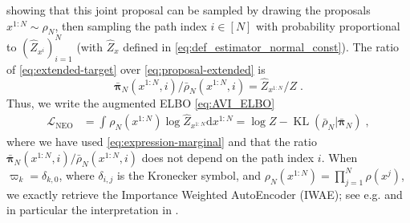 \documentclass{article}
\def\elboneq{\mathcal{L}_{\IFIS}}
\def\IFIS{\ensuremath{\operatorname{NEO}}}
\def\rmd{\operatorname{d}\hspace{-2pt}}
\def\rmd{\mathrm{d}}
\def\eqsp{\,}
\def\eqsp{\;}
\newcommand{\1}{\mathds{1}}
\def\proposal{\rho}
\newcommand{\chunku}[3]{#1^{#2:#3}}
\def\const{Z}
\newcommand{\estConstC}[1]{\widehat{Z}_{#1}}
\def\measpi{\boldsymbol{\pi}}
\def\rmd{\mathrm{d}}
\begin{document}
showing that this joint proposal can be sampled by drawing the proposals $\chunku{x}{1}{N} \sim \rho_N$, then sampling the path index $i \in [N]$ with probability proportional to $(\estConstC{x^i})_{i=1}^N$ (with $\estConstC{x}$ defined in \eqref{eq:def_estimator_normal_const}).
The ratio of \eqref{eq:extended-target} over \eqref{eq:proposal-extended} is
\begin{equation}
\label{eq:ratio-extended}
{\bar{\measpi}_N(\chunku{x}{1}{N},i)}\big/{\bar{\proposal}_N(\chunku{x}{1}{N},i)}= {\estConstC{\chunku{x}{1}{N}}}\big/{\const} \eqsp.
\end{equation}
Thus, we write the augmented ELBO   \eqref{eq:AVI_ELBO}
\begin{align}
 \label{eq:infine_elbo-alt}
\elboneq &= \int_{} \proposal_N( \chunku{x}{1}{N})   \log \estConstC{\chunku{x}{1}{N}} \rmd \chunku{x}{1}{N} = \log \const - \operatorname{KL}( \bar{\proposal}_N | \bar{\measpi}_N )\eqsp,
\end{align}
where we have used \eqref{eq:expression-marginal} and that the ratio ${\bar{\measpi}_N(\chunku{x}{1}{N},i)}\big/{\bar{\proposal}_N(\chunku{x}{1}{N},i)}$ does not depend on
the path index $i$. When $\varpi_k= \delta_{k,0}$, where $\delta_{i,j}$ is the Kronecker symbol, and $\proposal_N(\chunku{x}{1}{N})= \prod_{j=1}^N \proposal(x^j)$, we exactly retrieve the Importance Weighted AutoEncoder (IWAE); see e.g.  \cite{burda:grosse:2015} and in particular the interpretation in \cite{cremer2017reinterpreting}.
\end{document}
